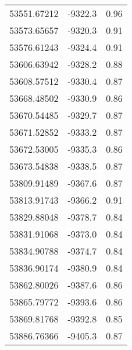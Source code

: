 \begin{table}
\begin{tabular}{l l l}
53551.67212	 & -9322.3	 &  0.96\\
53573.65657	 & -9320.3	 &  0.91\\
53576.61243	 & -9324.4	 &  0.91\\
53606.63942	 & -9328.2	 &  0.88\\
53608.57512	 & -9330.4	 &  0.87\\
53668.48502	 & -9330.9	 &  0.86\\
53670.54485	 & -9329.7	 &  0.87\\
53671.52852	 & -9333.2	 &  0.87\\
53672.53005	 & -9335.3 	 &  0.86\\
53673.54838	 & -9338.5	 &  0.87\\
53809.91489	 & -9367.6	 &  0.87\\
53813.91743	 & -9366.2	 &  0.91\\
53829.88048	 & -9378.7	 &  0.84\\
53831.91068	 & -9373.0	 &  0.84\\
53834.90788	 & -9374.7	 &  0.84\\
53836.90174	 & -9380.9	 &  0.84\\
53862.80026	 & -9387.6	 &  0.86\\
53865.79772	 & -9393.6	 &  0.86\\
53869.81768	 & -9392.8	 &  0.85\\
53886.76366	 & -9405.3	 &  0.87\\
\hline
\end{tabular} 
\end{table}